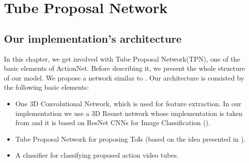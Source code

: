 


% 

\chapter{Tube Proposal Network}

\section{ Our implementation's architecture}
In this chapter, we get involved with Tube Proposal Network(TPN), one of the basic elements of ActionNet. Before describing it, we present
the whole structure of our model. We propose a network similar to \cite{DBLP:journals/corr/HouCS17}.
Our architecture is consisted by the following basic elements:
\begin{itemize}
\item One 3D Convolutional Network, which is used for feature extraction. In our implementation we use a 3D Resnet network whose implementation  is taken from   \cite{hara3dcnns} and it is based on ResNet CNNs for Image Classification (\cite{DBLP:journals/corr/HeZRS15}).
\item Tube Proposal Network for proposing ToIs (based on the idea presented in \cite{DBLP:journals/corr/HouCS17}).
\item A classifier for classifying proposed action video tubes.
\end{itemize}

